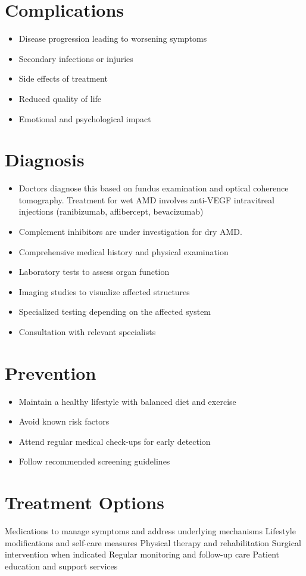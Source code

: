 \section{Complications}
\begin{itemize}[noitemsep]
  \item Disease progression leading to worsening symptoms
  \item Secondary infections or injuries
  \item Side effects of treatment
  \item Reduced quality of life
  \item Emotional and psychological impact
\end{itemize}
\section{Diagnosis}
\begin{itemize}[noitemsep]
  \item Doctors diagnose this based on fundus examination and optical coherence tomography. Treatment for wet AMD involves anti-VEGF intravitreal injections (ranibizumab, aflibercept, bevacizumab)
  \item Complement inhibitors are under investigation for dry AMD.
  \item Comprehensive medical history and physical examination
  \item Laboratory tests to assess organ function
  \item Imaging studies to visualize affected structures
  \item Specialized testing depending on the affected system
  \item Consultation with relevant specialists
\end{itemize}
\section{Prevention}
\begin{itemize}[noitemsep]
  \item Maintain a healthy lifestyle with balanced diet and exercise
  \item Avoid known risk factors
  \item Attend regular medical check-ups for early detection
  \item Follow recommended screening guidelines
\end{itemize}
\section{Treatment Options}
Medications to manage symptoms and address underlying mechanisms Lifestyle modifications and self-care measures Physical therapy and rehabilitation Surgical intervention when indicated Regular monitoring and follow-up care Patient education and support services

